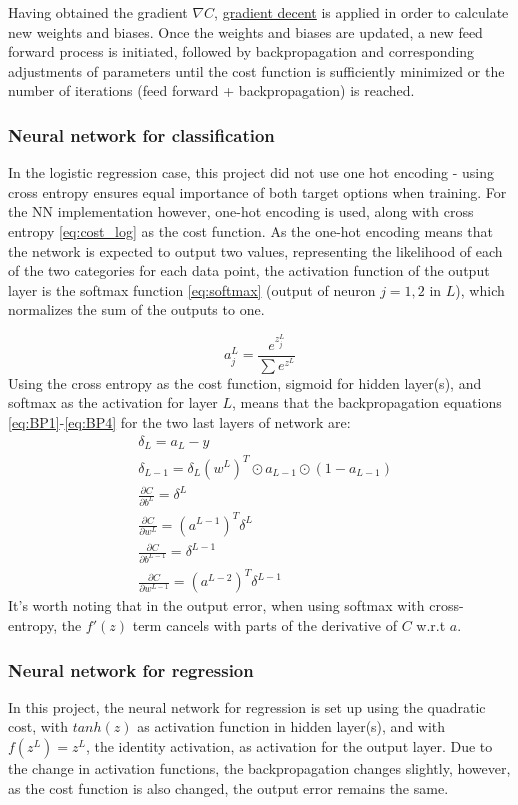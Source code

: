 \documentclass[%
oneside,                 %
final,                   %
10pt]{article}
\begin{document}
Having obtained the gradient $\nabla C$, \hyperref[Section_M_GD]{gradient decent} is applied in order to calculate new weights and biases. Once the weights and biases are updated, a new feed forward process is initiated, followed by backpropagation and corresponding adjustments of parameters until the cost function is sufficiently minimized or the number of iterations (feed forward + backpropagation) is reached.

\subsubsection{Neural network for classification}  \label{Section_M_NNclass}
In the logistic regression case, this project did not use one hot encoding - using  cross entropy ensures equal importance of both target options when training. For the NN implementation however, one-hot encoding is used, along with cross entropy \eqref{eq:cost_log} as the cost function. As the one-hot encoding means that the network is expected to output two values, representing the likelihood of each of the two categories for each data point, the activation function of the output layer is the softmax function \eqref{eq:softmax} (output of neuron $j=1,2$ in $L$), which normalizes the sum of the outputs to one. 

\begin{equation}
a_j^L= \frac{e^{z_j^L}}{\sum e^{z^L}}
\label{eq:softmax}
\end{equation}
Using the cross entropy as the cost function, sigmoid for hidden layer(s), and softmax as the activation for layer $L$, means that the backpropagation equations \eqref{eq:BP1}-\eqref{eq:BP4} for the two last layers of network are:
\begin{align*}
&\delta_L=a_L-y \\   
&\delta_{L-1}=\delta_L(w^{L})^T \odot  a_{L-1} \odot (1- a_{L-1})\\ 
&\frac{\partial C}{\partial b^L} =\delta^L\\ 
&\frac{\partial C}{\partial w^L} =(a^{L-1})^T \delta^{L}  \\
&\frac{\partial C}{\partial b^{L-1}} =\delta^{L-1}\\ 
&\frac{\partial C}{\partial w^{L-1}} =(a^{L-2})^T \delta^{L-1} 
\end{align*}
It's worth noting that in the output error, when using softmax with cross-entropy, the $f'(z)$ term cancels with parts of the derivative of $C$ w.r.t $a$.
\subsubsection{Neural network for regression}
In this project, the neural network for regression is set up using the quadratic cost, with $tanh (z)$ as activation function in hidden layer(s), and with $f(z^L)=z^L$, the identity activation, as activation for the output layer. Due to the change in activation functions, the backpropagation changes slightly, however, as the cost function is also changed, the output error remains the same.
\end{document}

